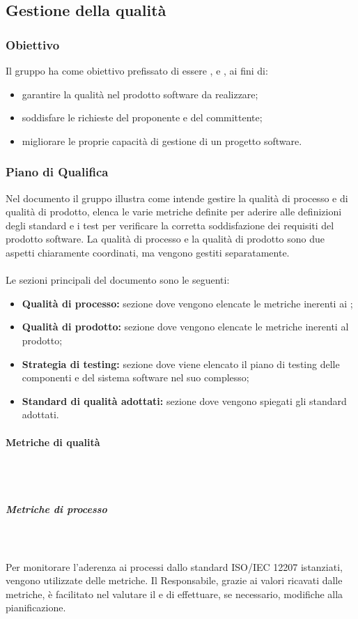 \subsection{Gestione della qualità}
\subsubsection{Obiettivo}
Il gruppo \Gruppo{} ha come obiettivo prefissato di essere ,  e , ai fini di:
\begin{itemize}
    \item garantire la qualità nel prodotto software da realizzare;
    \item soddisfare le richieste del proponente e del committente;
    \item migliorare le proprie capacità di gestione di un progetto software.
\end{itemize}

\subsubsection{Piano di Qualifica}
Nel documento \PdQ{} il gruppo \Gruppo{} illustra come intende gestire la qualità di processo e di qualità di prodotto, elenca le varie metriche definite per aderire alle definizioni degli standard e i test per verificare la corretta soddisfazione dei requisiti del prodotto software.
La qualità di processo e la qualità di prodotto sono due aspetti chiaramente coordinati, ma vengono gestiti separatamente. \\ \\
Le sezioni principali del documento sono le seguenti:
\begin{itemize}
    \item \textbf{Qualità di processo:} sezione dove vengono elencate le metriche inerenti ai ;
    \item \textbf{Qualità di prodotto:} sezione dove vengono elencate le metriche inerenti al prodotto;
    \item \textbf{Strategia di testing:} sezione dove viene elencato il piano di testing delle componenti e del sistema software nel suo complesso;
    \item \textbf{Standard di qualità adottati:} sezione dove vengono spiegati gli standard adottati.
\end{itemize}

\paragraph{Metriche di qualità}\mbox{}\\ \\
\subparagraph{Metriche di processo}\mbox{}\\ \\
Per monitorare l'aderenza ai processi dallo standard ISO/IEC 12207 istanziati, vengono utilizzate delle metriche. Il Responsabile, grazie ai valori ricavati dalle metriche, è facilitato nel
valutare il  e di effettuare, se necessario, modifiche alla pianificazione.\\

